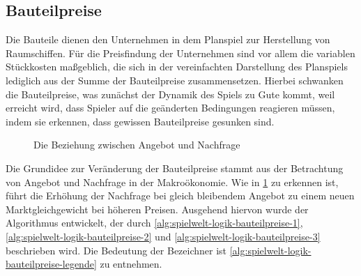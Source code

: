 
\subsection{Bauteilpreise}
\label{sub:spielwelt-logik-bauteilpreise}

Die Bauteile dienen den Unternehmen in dem Planspiel zur Herstellung von Raumschiffen. Für die Preisfindung der Unternehmen sind vor allem die variablen Stückkosten maßgeblich, die sich in der vereinfachten Darstellung des Planspiels lediglich aus der Summe der Bauteilpreise zusammensetzen. Hierbei schwanken die Bauteilpreise, was zunächst der Dynamik des Spiels zu Gute kommt, weil erreicht wird, dass Spieler auf die geänderten Bedingungen reagieren müssen, indem sie erkennen, dass gewissen Bauteilpreise gesunken sind.

\begin{figure}[ht]
\centering
{}
\caption{Die Beziehung zwischen Angebot und Nachfrage}
\label{img:spielwelt-logik-bauteilpreise-preismengendiagramm}
\end{figure}

Die Grundidee zur Veränderung der Bauteilpreise stammt aus der Betrachtung von Angebot und Nachfrage in der Makroökonomie. Wie in \ref{img:spielwelt-logik-bauteilpreise-preismengendiagramm} zu erkennen ist, führt die Erhöhung der Nachfrage bei gleich bleibendem Angebot zu einem neuen Marktgleichgewicht bei höheren Preisen. Ausgehend hiervon wurde der Algorithmus entwickelt, der durch \ref{alg:spielwelt-logik-bauteilpreise-1}, \ref{alg:spielwelt-logik-bauteilpreise-2} und \ref{alg:spielwelt-logik-bauteilpreise-3} beschrieben wird. Die Bedeutung der Bezeichner ist \ref{alg:spielwelt-logik-bauteilpreise-legende} zu entnehmen.


